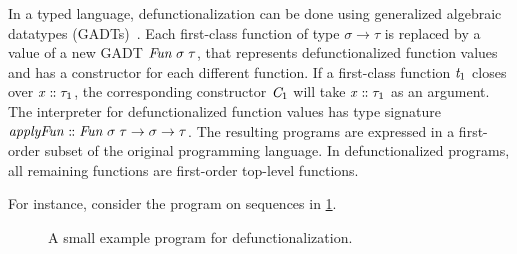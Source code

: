 In a typed language, defunctionalization can be done using generalized algebraic
datatypes (GADTs)~\citep{Pottier2004polymorphic}. Each first-class function of
type \ensuremath{\sigma\to \tau} is replaced by a value of a new GADT \ensuremath{\Conid{Fun}\;\sigma\;\tau}, that
represents defunctionalized function values and has a constructor for each
different function. If a first-class function \ensuremath{\Varid{t}_{1}} closes over \ensuremath{\Varid{x}\mathrel{:\mkern-1mu:}\tau_{1}}, the
corresponding constructor \ensuremath{\Conid{C}_{1}} will take \ensuremath{\Varid{x}\mathrel{:\mkern-1mu:}\tau_{1}} as an argument. The
interpreter for defunctionalized function values has type signature \ensuremath{\Varid{applyFun}\mathrel{:\mkern-1mu:}\Conid{Fun}\;\sigma\;\tau\to \sigma\to \tau}. The resulting programs are expressed in a
first-order subset of the original programming language.
In defunctionalized programs, all remaining functions are first-order top-level
functions.

For instance, consider the program on sequences in \cref{fig:defunc-example}.
\begin{figure}[h]
\texths %
\resethooks
\caption{A small example program for defunctionalization.}
\label{fig:defunc-example}
\end{figure}

